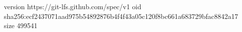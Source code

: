 version https://git-lfs.github.com/spec/v1
oid sha256:ecf2437071aad975b54892876b4f4f43a05c120f8bc661a683729bfac8842a17
size 499541
